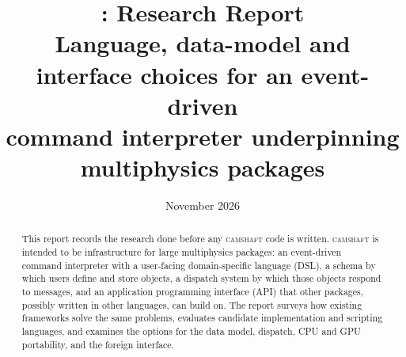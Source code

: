 \documentclass[11pt,a4paper]{article}
\title{\camshaft{}: Research Report\\[0.4ex]
\large Language, data-model and interface choices for an event-driven\\
command interpreter underpinning multiphysics packages}
\author{}
\date{November 2026}
\newcommand{\camshaft}{\textsc{camshaft}}
\begin{document}
\maketitle

\begin{abstract}
\noindent
This report records the research done before any \camshaft{} code is written.
\camshaft{} is intended to be infrastructure for large multiphysics packages: an
event-driven command interpreter with a user-facing domain-specific language
(DSL), a schema by which users define and store objects, a dispatch system by
which those objects respond to messages, and an application programming
interface (API) that other packages, possibly written in other languages, can
build on.  The report surveys how existing frameworks solve the same problems,
evaluates candidate implementation and scripting languages, and examines the
options for the data model, dispatch, CPU and GPU portability, and the foreign
interface.


\end{abstract}
\end{document}
